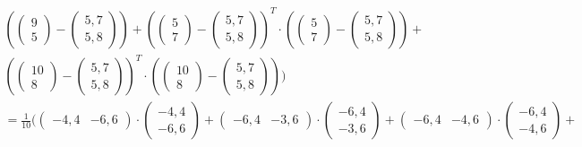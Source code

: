 \documentclass[a4paper,parskip=full-]{article}
\begin{document}
\begin{multline*}
\left( \begin{pmatrix}  9 \\  5 \end{pmatrix} - \begin{pmatrix} 5,7 \\ 5,8 \end{pmatrix} \right) + 
\left( \begin{pmatrix}  5 \\  7 \end{pmatrix} - \begin{pmatrix} 5,7 \\ 5,8 \end{pmatrix} \right)^T \cdot
\left( \begin{pmatrix}  5 \\  7 \end{pmatrix} - \begin{pmatrix} 5,7 \\ 5,8 \end{pmatrix} \right) + \\
\left( \begin{pmatrix} 10 \\  8 \end{pmatrix} - \begin{pmatrix} 5,7 \\ 5,8 \end{pmatrix} \right)^T \cdot
\left( \begin{pmatrix} 10 \\  8 \end{pmatrix} - \begin{pmatrix} 5,7 \\ 5,8 \end{pmatrix} \right) 
\Biggr) \\
= \frac{1}{10} \Biggl(
\begin{pmatrix} -4,4 &  -6,6 \end{pmatrix} \cdot
\begin{pmatrix} -4,4 \\ -6,6 \end{pmatrix} +
\begin{pmatrix} -6,4 &  -3,6 \end{pmatrix} \cdot
\begin{pmatrix} -6,4 \\ -3,6 \end{pmatrix} +
\begin{pmatrix} -6,4 &  -4,6 \end{pmatrix} \cdot
\begin{pmatrix} -6,4 \\ -4,6 \end{pmatrix} + \\

\end{multline*}
\end{document}
